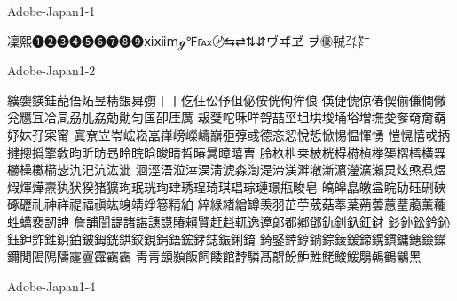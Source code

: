 Adobe-Japan1-1

凜熙❶❷❸❹❺❻❼❽❾ⅺⅻⅿℊ℉℻〄⇆⇄⇅⇵ヷヸヹ
ヺ㊝㍻㌳㍎

Adobe-Japan1-2

纊褜鍈銈蓜俉炻昱棈鋹曻彅⼁丨仡仼伀伃伹佖侒侊侚侔俍
偀倢俿倞偆偰偂傔僴僘兊兤冝冾凬刕劜劦勀勛匀匤卲厓厲
叝﨎咜咊咩哿喆坙坥垬埈埇﨏增墲夋奓奛奝奣妤妺孖寀甯
寘尞岦岺峵崧嵓嵂嵭嶸嶹巐弡弴彧德忞恝悅悊惞惕愠惲愑
愷愰憘戓抦揵摠撝擎敎昀昕昉昮昤晥晗晙晴晳暙暠暲暿曺
朎杦枻桒柀桄棏﨓楨﨔榘槢樰橫橆橳橾櫢櫤毖氿汜沆汯泚
洄涇浯涖涬淏淸淲淼渹湜渧渼溿澈澵濵瀅瀇瀨炅炫焏焄煜
煆煇燁燾犱犾猤猪獷玽珉珖珣珒琇珵琦琪琩琮璉璟甁畯皂
皜皞皛皦益睆劯砡硎硤硺礰礼神祥禔福禛竑竧靖竫箞精絈
綷綠緖繒罇羡羽茁荢荿菇菶葈蒴蕓蕙蕫﨟薰蘒﨡蠇裵訒訷
詹誧誾諟諸諶譓譿賰賴贒赶﨣軏逸遧郞都鄕鄧釚釗釞釭釮
釤釥鈆鈐鈊鈺鉀鈼鉎鉙鉑鈹鉧銧鉷鉸鋧鋗鋙鋐﨧鋕鋠鋓錥
錡鋻﨨錞鋿錝錂鍰鍗鎤鏆鏞鏸鐱鑅鑈閒﨩隝隯霳霻靃靍靏
⾭靑顗顥飯飼餧館馞驎髙髜魵魲鮏鮱鮻鰀鵰鵫鶴鸙黑

Adobe-Japan1-4

